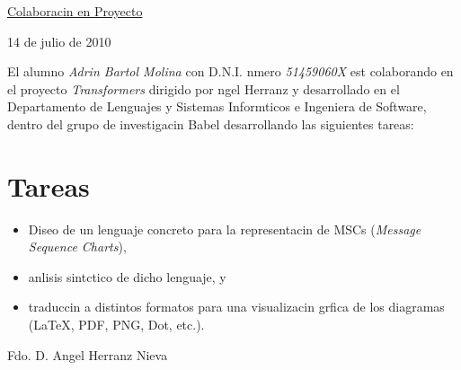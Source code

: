 \documentclass[12pt]{article}
\begin{document}
\thispagestyle{empty}
\pagestyle{empty}

\mbox{}
\vspace{5cm}

\begin{center}
  \LARGE
  \underline{Colaboracin en Proyecto}
\end{center}

\begin{center}
  \large
  14 de julio de 2010
\end{center}


El alumno \emph{Adrin Bartol Molina} con D.N.I. nmero
\emph{51459060X} est colaborando en el proyecto \emph{Transformers}
dirigido por ngel Herranz y desarrollado en el Departamento de
Lenguajes y Sistemas Informticos e Ingeniera de Software, dentro del
grupo de investigacin Babel desarrollando las siguientes tareas:

\section*{Tareas}
\begin{itemize}
\item Diseo de un lenguaje concreto para la representacin de MSCs (\emph{Message Sequence Charts}),
\item anlisis sintctico de dicho lenguaje, y
\item traduccin a distintos formatos para una visualizacin grfica
  de los diagramas (LaTeX, PDF, PNG, Dot, etc.).
\end{itemize}

\vspace{2cm}
Fdo. D. Angel Herranz Nieva
\end{document}
